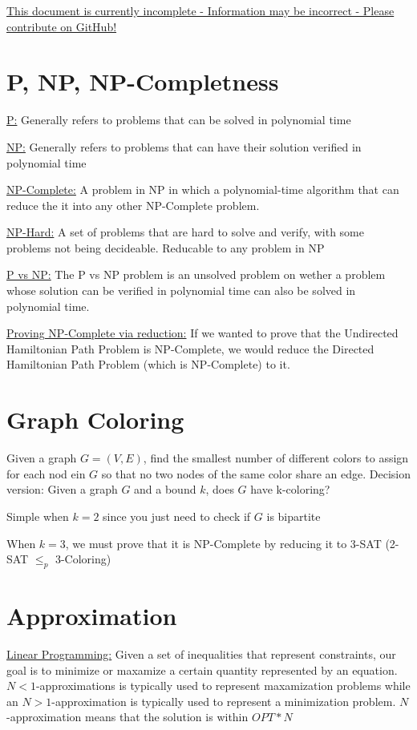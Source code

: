 \documentclass{article}
\begin{document}
\underline{This document is currently incomplete - Information may be incorrect - Please contribute on GitHub!}

\section{P, NP, NP-Completness}

\underline{P:} Generally refers to problems that can be solved in polynomial time

\underline{NP:} Generally refers to problems that can have their solution verified in polynomial time

\underline{NP-Complete:} A problem in NP in which a polynomial-time algorithm that can reduce
the it into any other NP-Complete problem. 

\underline{NP-Hard:} A set of problems that are hard to solve and verify, with some problems not being decideable. Reducable to any problem in NP

\underline{P vs NP:} The P vs NP problem is an unsolved problem on wether a problem whose solution can be
verified in polynomial time can also be solved in polynomial time. 

\underline{Proving NP-Complete via reduction:} If we wanted to prove that the Undirected Hamiltonian Path Problem 
is NP-Complete, we would reduce the Directed Hamiltonian Path Problem (which is NP-Complete) to it.

\section{Graph Coloring}
Given a graph $G = (V, E)$, find the smallest number of different colors to assign for 
each nod ein $G$ so that no two nodes of the same color share an edge. Decision version: 
Given a graph $G$ and a bound $k$, does $G$ have k-coloring?

Simple when $k=2$ since you just need to check if $G$ is bipartite

When $k=3$, we must prove that it is NP-Complete by reducing it to 3-SAT (2-SAT $\leq_p$ 3-Coloring)

\section{Approximation}
\underline{Linear Programming:} Given a set of inequalities that represent constraints, our
goal is to minimize or maxamize a certain quantity represented 
by an equation.
$N<1$-approximations is typically used to represent maxamization problems while
an $N>1$-approximation is typically used to represent a minimization problem. 
$N$-approximation means that the solution is within $OPT*N$
\end{document}
